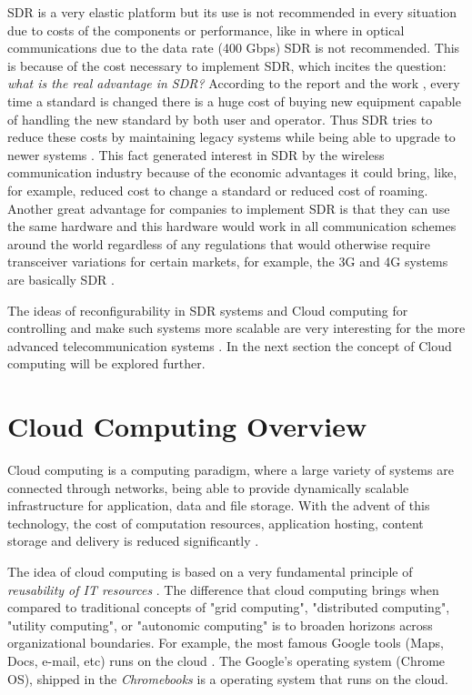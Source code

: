 SDR is a very elastic platform but its use is not recommended in every situation
due to costs of the components or performance, like in \cite{ilan2015} where in
optical communications due to the data rate (400 Gbps) SDR is not recommended.
This is because of the cost necessary to implement SDR, which incites the
question: \emph{what is the real advantage in SDR?} According to the report
\cite{introlte} and the work \cite{alan2008}, every time a standard is changed
there is a huge cost of buying new equipment capable of handling the new
standard by both user and operator. Thus SDR tries to reduce these costs by
maintaining legacy systems while being able to upgrade to newer systems
\cite{dayananda2012}. This fact generated interest in SDR \cite{alan2008}
\cite{dayananda2012} by the wireless communication industry because of the
economic advantages it could bring, like, for example, reduced cost to change a
standard or reduced cost of roaming. Another great advantage for companies to
implement SDR is that they can use the same hardware and this hardware would
work in all communication schemes around the world regardless of any regulations
that would otherwise require transceiver variations for certain markets, for
example, the 3G and 4G systems are basically SDR \cite{octasicbts}.

The ideas of reconfigurability in SDR systems and Cloud computing for
controlling and make such systems more scalable are very interesting for the
more advanced telecommunication systems \cite{dayananda2012}. In the next
section the concept of Cloud computing will be explored further.

\section{Cloud Computing Overview}
\label{sec:sdr_cloud}

Cloud computing is a computing paradigm, where a large variety of systems are
connected through networks, being able to provide dynamically scalable
infrastructure for application, data and file storage. With the advent of this
technology, the cost of computation resources, application hosting, content
storage and delivery is reduced significantly \cite{dayananda2012}.

The idea of cloud computing is based on a very fundamental principle of
\emph{reusability of IT resources} \cite{dayananda2012}. The difference that
cloud computing brings when compared to traditional concepts of "grid
computing", "distributed computing", "utility computing", or "autonomic
computing" is to broaden horizons across organizational boundaries. For example,
the most famous Google tools (Maps, Docs, e-mail, etc) runs on the cloud
\cite{web:googledocs}. The Google's operating system (Chrome OS), shipped in the
\textit{Chromebooks} \cite{we:googlechromebook} is a operating system that runs
on the cloud.


